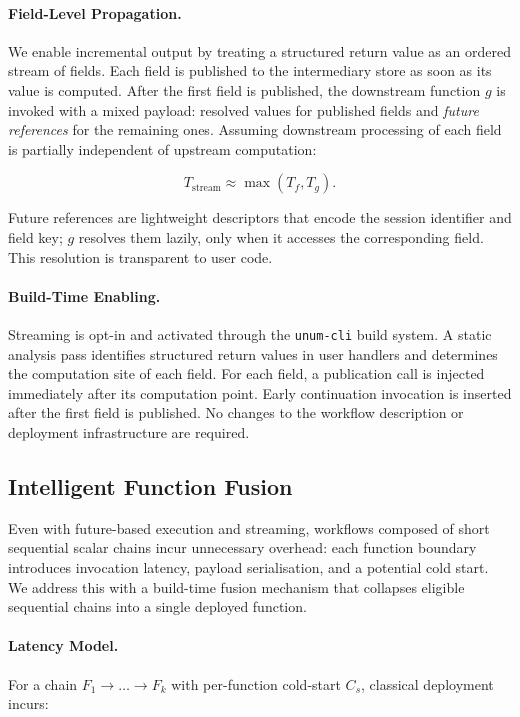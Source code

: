 \documentclass[runningheads]{llncs}
\begin{document}
\paragraph{Field-Level Propagation.}
We enable incremental output by treating a structured return value as an ordered stream of fields. Each field is published to the intermediary store as soon as its value is computed. After the first field is published, the downstream function $g$ is invoked with a mixed payload: resolved values for published fields and \emph{future references} for the remaining ones. Assuming downstream processing of each field is partially independent of upstream computation:

\begin{equation}
T_{\text{stream}} \approx \max(T_f, T_g).
\end{equation}

Future references are lightweight descriptors that encode the session identifier and field key; $g$ resolves them lazily, only when it accesses the corresponding field. This resolution is transparent to user code.

\paragraph{Build-Time Enabling.}
Streaming is opt-in and activated through the \texttt{unum-cli} build system. A static analysis pass identifies structured return values in user handlers and determines the computation site of each field. For each field, a publication call is injected immediately after its computation point. Early continuation invocation is inserted after the first field is published. No changes to the workflow description or deployment infrastructure are required.

\subsection{Intelligent Function Fusion}

Even with future-based execution and streaming, workflows composed of short sequential scalar chains incur unnecessary overhead: each function boundary introduces invocation latency, payload serialisation, and a potential cold start. We address this with a build-time fusion mechanism that collapses eligible sequential chains into a single deployed function.

\paragraph{Latency Model.}
For a chain $F_1 \rightarrow \dots \rightarrow F_k$ with per-function cold-start $C_s$, classical deployment incurs:
\end{document}
